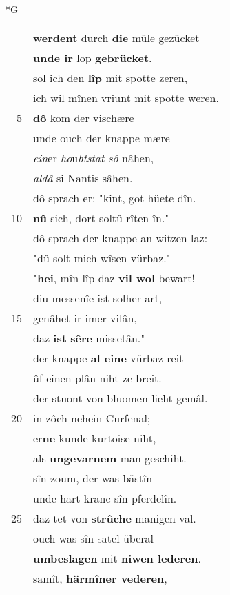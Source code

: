 \documentclass[8pt,a4paper,notitlepage]{article}
\begin{document}
\begin{table}[ht]
\begin{minipage}[t]{0.5\linewidth}
\small
\begin{center}*G
\end{center}
\begin{tabular}{rl}
 & \textbf{werdent} durch \textbf{die} müle gezücket\\ 
 & \textbf{unde ir} lop \textbf{gebrücket}.\\ 
 & sol ich den \textbf{lîp} mit spotte zeren,\\ 
 & ich wil mînen vriunt mit spotte weren.\\ 
5 & \textbf{dô} kom der vischære\\ 
 & unde ouch der knappe mære\\ 
 & \textit{ein}er \textit{ho}u\textit{btstat sô} nâhen,\\ 
 & \textit{aldâ} si Nantis sâhen.\\ 
 & dô sprach er: "kint, got hüete dîn.\\ 
10 & \textbf{nû} sich, dort soltû rîten în."\\ 
 & dô sprach der knappe an witzen laz:\\ 
 & "dû solt mich wîsen vürbaz."\\ 
 & "\textbf{hei}, mîn lîp daz \textbf{vil wol} bewart!\\ 
 & diu messenîe ist solher art,\\ 
15 & genâhet ir imer vilân,\\ 
 & daz \textbf{ist} \textbf{sêre} missetân."\\ 
 & der knappe \textbf{al eine} vürbaz reit\\ 
 & ûf einen plân niht ze breit.\\ 
 & der stuont von bluomen lieht gemâl.\\ 
20 & in zôch nehein Curfenal;\\ 
 & er\textbf{ne} kunde kurtoise niht,\\ 
 & als \textbf{ungevarnem} man geschiht.\\ 
 & sîn zoum, der was bästîn\\ 
 & unde hart kranc sîn pferdelîn.\\ 
25 & daz tet von \textbf{strûche} manigen val.\\ 
 & ouch was sîn satel überal\\ 
 & \textbf{umbeslagen} mit \textbf{niwen lederen}.\\ 
 & samît, \textbf{härmîner vederen},\\ 

\end{tabular}
\end{minipage}
\end{table}
\end{document}
